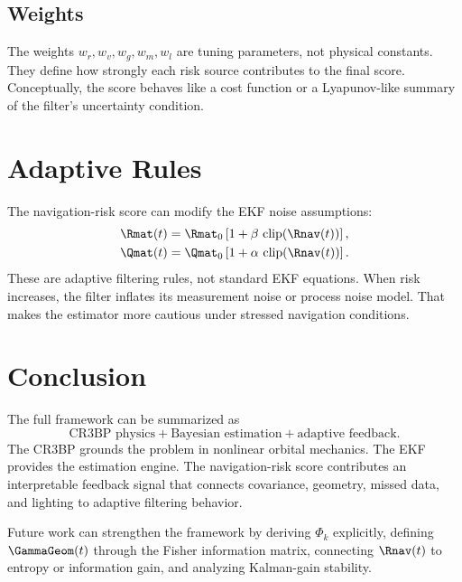 \documentclass[11pt]{article}
\begin{document}
\subsection{Weights}

The weights $w_r,w_v,w_g,w_m,w_l$ are tuning parameters, not physical
constants. They define how strongly each risk source contributes to the final
score. Conceptually, the score behaves like a cost function or a Lyapunov-like
summary of the filter's uncertainty condition.

\section{Adaptive Rules}

The navigation-risk score can modify the EKF noise assumptions:
\begin{align}
  \Rmat(t)
  &=
  \Rmat_0
  \left[
    1+\beta\,\operatorname{clip}(\Rnav(t))
  \right],
  \\
  \Qmat(t)
  &=
  \Qmat_0
  \left[
    1+\alpha\,\operatorname{clip}(\Rnav(t))
  \right].
\end{align}
These are adaptive filtering rules, not standard EKF equations. When risk
increases, the filter inflates its measurement noise or process noise model.
That makes the estimator more cautious under stressed navigation conditions.

\section{Conclusion}

The full framework can be summarized as
\begin{equation}
  \text{CR3BP physics}
  +
  \text{Bayesian estimation}
  +
  \text{adaptive feedback}.
\end{equation}
The CR3BP grounds the problem in nonlinear orbital mechanics. The EKF provides
the estimation engine. The navigation-risk score contributes an interpretable
feedback signal that connects covariance, geometry, missed data, and lighting
to adaptive filtering behavior.

Future work can strengthen the framework by deriving $\Phi_k$ explicitly,
defining $\GammaGeom(t)$ through the Fisher information matrix, connecting
$\Rnav(t)$ to entropy or information gain, and analyzing Kalman-gain stability.
\end{document}
